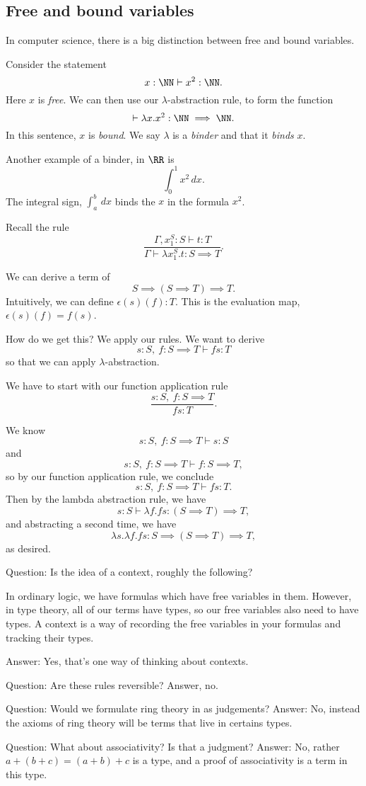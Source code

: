 \documentclass{article}
\newcommand{\yields}{\vdash}
\begin{document}
\subsection{Free and bound variables}

In computer science, there is a big distinction between free and 
bound variables. 

Consider the statement
\[ x:\NN \yields x^2:\NN. \]
Here $x$ is \emph{free}. 
We can then use our $\lambda$-abstraction
rule, to form the function
\[\yields \lambda x.x^2 : \NN\implies \NN.\]
In this sentence, $x$ is \emph{bound}. We say $\lambda$ is a
\emph{binder} and that it \emph{binds} $x$.

Another example of a binder, in $\RR$ is 
\[\int_0^1 x^2\,dx.\]
The integral sign, $\int_a^b\,dx$
binds the $x$ in the formula $x^2$.

Recall the rule
\[\frac{
    \Gamma,x_1^S:S\yields t:T}{
    \Gamma \yields \lambda x_1^S.t : S\implies T}.\]

\begin{example}
    We can derive a term of
    \[ S\implies (S\implies T) \implies T. \]
    Intuitively, we can define $\epsilon(s)(f) : T$.
    This is the evaluation map, $\epsilon(s)(f)=f(s)$.

    How do we get this? We apply our rules.
    We want to derive 
    \[s:S,\ f:S\implies T \yields fs:T \]
    so that we can apply $\lambda$-abstraction.

    We have to start with our function application rule
    \[\frac{s:S,\ f:S\implies T}{fs:T}.\]

    We know
    \[s:S,\ f:S\implies T\yields s:S\]
    and 
    \[s:S,\ f:S\implies T\yields f:S\implies T, \]
    so by our function application rule, we conclude
    \[ s:S,\ f:S\implies T 
    \yields fs : T.\]
    Then by the lambda abstraction rule, we have
    \[ s:S \yields \lambda f.fs : (S\implies T) \implies T, \]
    and abstracting a second time, we have
    \[ \lambda s.\lambda f.fs : S\implies (S\implies T) \implies T, \]
    as desired.
    
    Question: Is the idea of a context, roughly the following?
    
    In ordinary logic, we have formulas 
    which have free variables in them. However, in
    type theory, all of our terms have types, so our 
    free variables also need to have types. A context is a 
    way of recording the free variables in your formulas 
    and tracking their types.

    Answer: Yes, that's one way of thinking about contexts.

    Question: Are these rules reversible? Answer, no.

    Question: Would we formulate ring theory in as judgements?
    Answer: No, instead the axioms of ring theory will be 
    terms that live in certains types.
    
    Question: What about associativity? Is that a judgment?
    Answer: No, rather $a+(b+c) = (a+b)+c$ is a type, and a proof of
    associativity is a term in this type.







\end{example}
\end{document}
